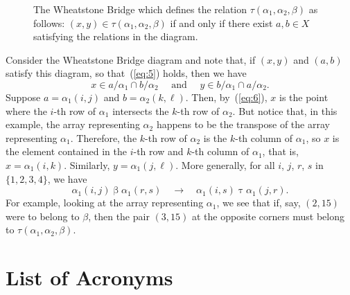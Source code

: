 \documentclass{amsart}
\theoremstyle{plain}
\theoremstyle{definition}
\theoremstyle{definition}
\numberwithin{equation}{section}
\newcommand{\<}{\ensuremath{\langle}}
\renewcommand{\>}{\ensuremath{\rangle}}
\newcommand{\rbeta}{\ensuremath{\mathrel{\beta}}}
\newcommand{\rtau}{\ensuremath{\mathrel{\tau}}}
\begin{document}
\begin{figure}
  \caption{The Wheatstone Bridge which defines the relation 
    $\tau(\alpha_1, \alpha_2, \beta)$ as follows: 
    $(x,y) \in \tau(\alpha_1, \alpha_2, \beta)$ if and only if there 
    exist $a, b \in X$ satisfying the relations in the diagram.}
  \label{fig:rhoagain}
\end{figure}

Consider the Wheatstone Bridge diagram and note that, if 
$(x,y)$ and $(a, b)$ satisfy this diagram, so that~(\ref{eq:5}) holds, then  we have
\begin{equation}
\label{eq:6}  
x \in a/\alpha_1 \cap b/\alpha_2 \quad \text{ and } \quad 
y \in b/\alpha_1 \cap a/\alpha_2.
\end{equation}
Suppose $a = \alpha_1(i,j)$ and $b = \alpha_2(k,\ell)$.  Then, by~(\ref{eq:6}),  $x$ is the
point where the $i$-th row of $\alpha_1$ intersects the $k$-th row of
$\alpha_2$.  But notice that, in this example, the array representing $\alpha_2$
happens to be the transpose of the array representing $\alpha_1$.  Therefore,
the $k$-th row of $\alpha_2$ is the $k$-th column of $\alpha_1$, so $x$ is
the element contained in the $i$-th row and $k$-th column of $\alpha_1$, that is, 
$x = \alpha_1(i,k)$. Similarly, $y = \alpha_1(j,\ell)$.  More generally, for all
$i$, $j$, $r$, $s$ in $\{1, 2, 3, 4\}$, we have
\[
\alpha_1(i,j) \rbeta \alpha_1(r,s) \quad \longrightarrow \quad 
\alpha_1(i,s) \rtau \alpha_1(j,r).
\]
For example, looking at the array representing $\alpha_1$, we see that if, say,
$(2,15)$ were to belong to $\beta$, then the pair $(3,15)$ at 
the opposite corners must belong to $\tau(\alpha_1, \alpha_2, \beta)$.

\vskip2cm

\section{List of Acronyms}
\begin{acronym}
\end{acronym}




\end{document}
